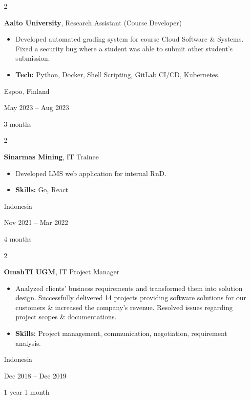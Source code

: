 \documentclass[10pt, a4paper]{article}
\newenvironment{highlights}{
    \begin{itemize}[
        topsep=0.10 cm,
        parsep=0.10 cm,
        partopsep=0pt,
        itemsep=0pt,
        leftmargin=0 cm + 10pt
    ]
}{
    \end{itemize}
} %
\newenvironment{twocolentry}[2][]{
    \onecolentry
    \def\secondColumn{#2}
    \setcolumnwidth{\fill, 3.1 cm}
    \begin{paracol}{2}
}{
    \switchcolumn \raggedleft \secondColumn
    \end{paracol}
    \endonecolentry
} %
\begin{document}
        \begin{twocolentry}{
            Espoo, Finland

        May 2023 – Aug 2023

        3 months
        }
            \textbf{Aalto University}, Research Assistant (Course Developer)
            \begin{highlights}
                \item Developed automated grading system for course Cloud Software \& Systems. Fixed a security bug where a student was able to submit other student's submission.
                \item \textbf{Tech:} Python, Docker, Shell Scripting, GitLab CI/CD, Kubernetes.
            \end{highlights}
        \end{twocolentry}


        \vspace{0.2 cm}

        \begin{twocolentry}{
            Indonesia

        Nov 2021 – Mar 2022

        4 months
        }
            \textbf{Sinarmas Mining}, IT Trainee
            \begin{highlights}
                \item Developed LMS web application for internal RnD.
                \item \textbf{Skills:} Go, React
            \end{highlights}
        \end{twocolentry}


        \vspace{0.2 cm}

        \begin{twocolentry}{
            Indonesia

        Dec 2018 – Dec 2019

        1 year 1 month
        }
            \textbf{OmahTI UGM}, IT Project Manager
            \begin{highlights}
                \item Analyzed clients' business requirements and transformed them into solution design. Successfully delivered 14 projects providing software solutions for our customers \& increased the company's revenue. Resolved issues regarding project scopes \& documentations.
                \item \textbf{Skills:} Project management, communication, negotiation, requirement analysis.
            \end{highlights}
        \end{twocolentry}
\end{document}
